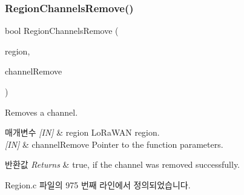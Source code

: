 \subsubsection{\texorpdfstring{Region\+Channels\+Remove()}{RegionChannelsRemove()}}
{\footnotesize\ttfamily bool Region\+Channels\+Remove (\begin{DoxyParamCaption}\item[{\mbox{\hyperlink{group___l_o_r_a_m_a_c_ga80c48efda9ae02e14b58160d34a798dd}{Lo\+Ra\+Mac\+Region\+\_\+t}}}]{region,  }\item[{\mbox{\hyperlink{group___r_e_g_i_o_n_gaa37468560d2fc81a977b57a48e5d72c0}{Channel\+Remove\+Params\+\_\+t}} $\ast$}]{channel\+Remove }\end{DoxyParamCaption})}



Removes a channel. 


\begin{DoxyParams}{매개변수}
{\em \mbox{[}\+I\+N\mbox{]}} & region Lo\+Ra\+W\+AN region.\\
\hline
{\em \mbox{[}\+I\+N\mbox{]}} & channel\+Remove Pointer to the function parameters.\\
\hline
\end{DoxyParams}

\begin{DoxyRetVals}{반환값}
{\em Returns} & true, if the channel was removed successfully. \\
\hline
\end{DoxyRetVals}


Region.\+c 파일의 975 번째 라인에서 정의되었습니다.


